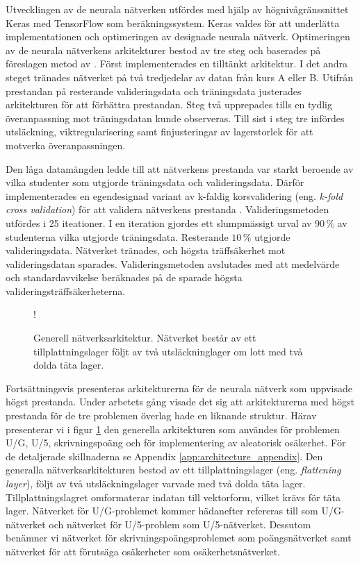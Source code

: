 Utvecklingen av de neurala nätverken utfördes med hjälp av högnivågränssnittet Keras \cite{Chollet} med TensorFlow \cite{Chollet} som beräkningssystem. Keras valdes för att underlätta implementationen och optimeringen av designade neurala nätverk. Optimeringen av de neurala nätverkens arkitekturer bestod av tre steg och baserades på föreslagen metod av \cite{Chollet}. Först implementerades en tilltänkt arkitektur. I det andra steget tränades nätverket på två tredjedelar av datan från kurs A eller B. Utifrån prestandan på resterande valideringsdata och träningsdata justerades arkitekturen för att förbättra prestandan. Steg två upprepades tills en tydlig överanpassning mot träningsdatan kunde observeras. Till sist i steg tre infördes utsläckning, viktregularisering samt finjusteringar av lagerstorlek för att motverka överanpassningen. 

Den låga datamängden ledde till att nätverkens prestanda var starkt beroende av vilka studenter som utgjorde träningsdata och valideringsdata. Därför implementerades en egendesignad variant av k-faldig korsvalidering (eng. \emph{k-fold cross validation}) för att validera nätverkens prestanda  \cite{Chollet}. Valideringsmetoden utfördes i 25 iteationer. I en iteration gjordes ett slumpmässigt urval av $90 \, \%$ av studenterna vilka utgjorde träningsdata. Resterande $10 \, \%$ utgjorde valideringsdata. Nätverket tränades, och högsta träffsäkerhet mot valideringsdatan sparades. Valideringsmetoden avslutades med att medelvärde och standardavvikelse beräknades på de sparade högsta valideringsträffsäkerheterna.  

\begin{figure}[hbtp]
    \centering
    \resizebox {0.9\textwidth} {!} {
        
    }
    \caption{Generell nätverksarkitektur. Nätverket består av ett tillplattningslager följt av två utsläckninglager om lott med två dolda täta lager.}
    \label{fig:gu-u5_model}
\end{figure}

Fortsättningsvis presenteras arkitekturerna för de neurala nätverk som uppvisade högst prestanda. Under arbetets gång visade det sig att arkitekturerna med högst prestanda för de tre problemen överlag hade en liknande struktur. Härav presenterar vi i figur \ref{fig:gu-u5_model} den generella arkitekturen som användes för problemen U/G, U/5, skrivningspoäng och för implementering av aleatorisk osäkerhet. För de detaljerade skillnaderna se Appendix \ref{app:architecture_appendix}. Den generalla nätverksarkitekturen bestod av ett tillplattningslager (eng. \emph{flattening layer}), följt av två utsläckningslager varvade med två dolda täta lager. Tillplattningslagret omformaterar indatan till vektorform, vilket krävs för täta lager. Nätverket för U/G-problemet kommer hädanefter refereras till som U/G-nätverket och nätverket för U/5-problem som U/5-nätverket. Dessutom benämner vi nätverket för skrivningspoängsproblemet  som poängsnätverket samt nätverket för att förutsäga osäkerheter som osäkerhetsnätverket.

